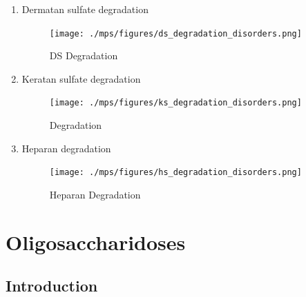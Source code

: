 \documentclass{scrartcl}
\begin{document}
\begin{enumerate}
\item Dermatan sulfate degradation
\label{sec:org6624874}
\begin{figure}[htbp]
\centering
\texttt{[image: ./mps/figures/ds\_degradation\_disorders.png]}
\caption[DS Degradation]{\label{fig:org0ac7a82}
DS Degradation}
\end{figure}


\item Keratan sulfate degradation
\label{sec:org2bdd3bd}

\begin{figure}[htbp]
\centering
\texttt{[image: ./mps/figures/ks\_degradation\_disorders.png]}
\caption[KS Degradation]{\label{fig:org0f3f663}
Degradation}
\end{figure}


\item Heparan degradation
\label{sec:org9e586e1}

\begin{figure}[htbp]
\centering
\texttt{[image: ./mps/figures/hs\_degradation\_disorders.png]}
\caption[HS Degradation]{\label{fig:org14614f7}
Heparan Degradation}
\end{figure}
\end{enumerate}

\section{Oligosaccharidoses}
\label{sec:org34a5232}
\subsection{Introduction}
\label{sec:orge4f5aaa}
\end{document}
